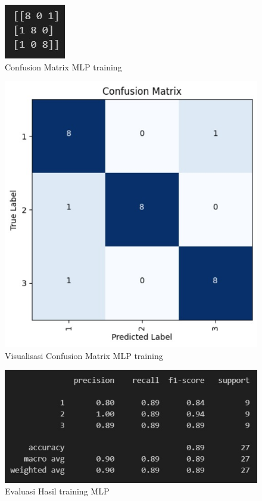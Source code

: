 \begin{figure} [H] \centering
  \includegraphics[scale=1]{gambar/cfmlp.jpg}
  \caption{Confusion Matrix MLP training}
  \label{fig:evalcfmlp}
\end{figure}

\begin{figure} [H] \centering
  \includegraphics[scale=0.65]{gambar/cfpmlp.jpg}
  \caption{Visualisasi Confusion Matrix MLP training}
  \label{fig:evalcfpmlp}
\end{figure}

\begin{figure} [H] \centering
  \includegraphics[scale=0.65]{gambar/evalmlp.jpg}
  \caption{Evaluasi Hasil training MLP}
  \label{fig:evalmlpl}
\end{figure}

